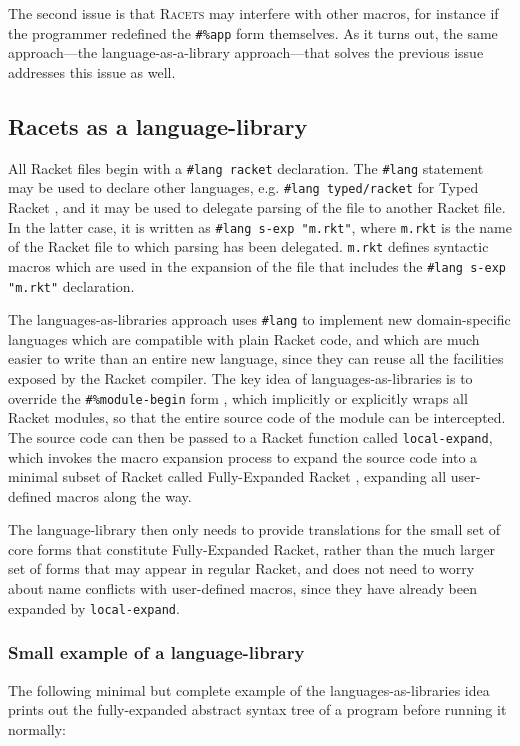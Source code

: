 \documentclass{article}
\begin{document}
The second issue is that \textsc{Racets} may interfere with other macros, for instance if the programmer redefined the \texttt{\#\%app} form themselves. As it turns out, the same approach---the language-as-a-library approach---that solves the previous issue addresses this issue as well.


\subsection{Racets as a language-library}
All Racket files begin with a \texttt{\#lang racket} declaration. The \texttt{\#lang} statement may be used to declare other languages, e.g. \texttt{\#lang typed/racket} for Typed Racket \cite{typed-racket}, and it may be used to delegate parsing of the file to another Racket file. In the latter case, it is written as \texttt{\#lang s-exp "m.rkt"}, where \texttt{m.rkt} is the name of the Racket file to which parsing has been delegated. \texttt{m.rkt} defines syntactic macros which are used in the expansion of the file that includes the \texttt{\#lang s-exp "m.rkt"} declaration.

The languages-as-libraries approach \cite{lang-as-lib} uses \texttt{\#lang} to implement new domain-specific languages which are compatible with plain Racket code, and which are much easier to write than an entire new language, since they can reuse all the facilities exposed by the Racket compiler. The key idea of languages-as-libraries is to override the \texttt{\#\%module-begin} form , which implicitly or explicitly wraps all Racket modules, so that the entire source code of the module can be intercepted. The source code can then be passed to a Racket function called \texttt{local-expand}, which invokes the macro expansion process to expand the source code into a minimal subset of Racket called Fully-Expanded Racket \cite{fe-racket}, expanding all user-defined macros along the way.

The language-library then only needs to provide translations for the small set of core forms that constitute Fully-Expanded Racket, rather than the much larger set of forms that may appear in regular Racket, and does not need to worry about name conflicts with user-defined macros, since they have already been expanded by \texttt{local-expand}.


\subsubsection{Small example of a language-library}
The following minimal but complete example of the languages-as-libraries idea prints out the fully-expanded abstract syntax tree of a program before running it normally:
\end{document}
